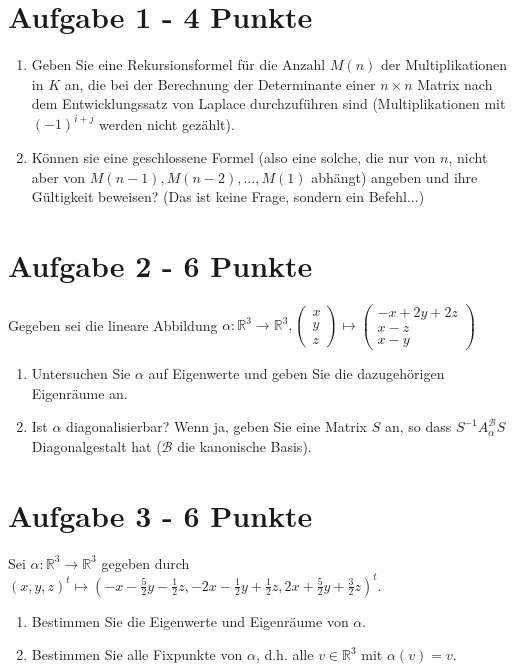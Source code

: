 \section*{Aufgabe 1 - 4 Punkte}
  \begin{enumerate}[label=\alph*)]
    \item Geben Sie eine Rekursionsformel für die Anzahl $M(n)$ der Multiplikationen in $K$ an, die bei der Berechnung der Determinante einer $n \times n$ Matrix nach dem Entwicklungssatz von Laplace durchzuführen sind (Multiplikationen mit $(-1)^{i+j}$ werden nicht gezählt).
    \item Können sie eine geschlossene Formel (also eine solche, die nur von $n$, nicht aber von $M(n-1), M(n-2),...,M(1)$ abhängt) angeben und ihre Gültigkeit beweisen? (Das ist keine Frage, sondern ein Befehl...)\\


  \end{enumerate}
\section*{Aufgabe 2 - 6 Punkte}
Gegeben sei die lineare Abbildung $\alpha: \mathbb{R}^3 \rightarrow \mathbb{R}^3, \begin{pmatrix} x\\y\\ z\end{pmatrix} \mapsto \begin{pmatrix} -x + 2y + 2z\\ x-z\\ x-y \end{pmatrix}$
  \begin{enumerate}[label=\alph*)]
    \item Untersuchen Sie $\alpha$ auf Eigenwerte und geben Sie die dazugehörigen Eigenräume an.
    \item  Ist $\alpha$ diagonalisierbar? Wenn ja, geben Sie eine Matrix $S$ an, so dass $S^{-1}A_{\alpha}^{\mathcal{B}}S $Diagonalgestalt hat ($\mathcal{B}$ die kanonische Basis).
  \end{enumerate}

\section*{Aufgabe 3 - 6 Punkte}
Sei $\alpha : \mathbb{R}^3 \rightarrow \mathbb{R}^3$ gegeben durch $(x,y,z)^t \mapsto (-x- \frac{5}{2}y - \frac{1}{2}z, -2x - \frac{1}{2}y + \frac{1}{2}z, 2x + \frac{5}{2}y + \frac{3}{2}z)^t$.
  \begin{enumerate}[label=\alph*)]
    \item Bestimmen Sie die Eigenwerte und Eigenräume von $\alpha$.
    \item Bestimmen Sie alle Fixpunkte von $\alpha$, d.h. alle $v \in \mathbb{R}^3$ mit $\alpha(v) = v$.
  \end{enumerate}
